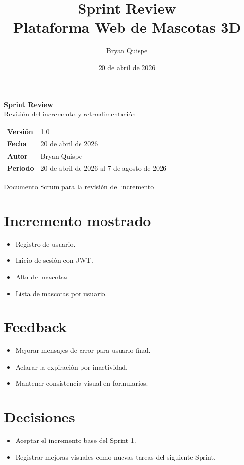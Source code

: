 \documentclass[12pt,a4paper]{article}
\title{\Huge\textbf{Sprint Review}\\[0.3em]\Large Plataforma Web de Mascotas 3D}
\author{Bryan Quispe}
\date{20 de abril de 2026}
\begin{document}
\begin{titlepage}
\centering
\vspace*{1.8cm}
{\Huge\bfseries\color{PrimaryBlue} Sprint Review\\[0.35em]}
{\LARGE Revisión del incremento y retroalimentación\\[1.2cm]}

\begin{tabular}{p{5cm} p{8cm}}
\rowcolor{SoftGray}
\textbf{Versión} & 1.0 \\
\textbf{Fecha} & 20 de abril de 2026 \\
\textbf{Autor} & Bryan Quispe \\
\textbf{Periodo} & 20 de abril de 2026 al 7 de agosto de 2026 \\
\end{tabular}

\vfill
{\large Documento Scrum para la revisión del incremento}
\end{titlepage}

\section{Incremento mostrado}
\begin{itemize}[leftmargin=*]
    \item Registro de usuario.
    \item Inicio de sesión con JWT.
    \item Alta de mascotas.
    \item Lista de mascotas por usuario.
\end{itemize}

\section{Feedback}
\begin{itemize}[leftmargin=*]
    \item Mejorar mensajes de error para usuario final.
    \item Aclarar la expiración por inactividad.
    \item Mantener consistencia visual en formularios.
\end{itemize}

\section{Decisiones}
\begin{itemize}[leftmargin=*]
    \item Aceptar el incremento base del Sprint 1.
    \item Registrar mejoras visuales como nuevas tareas del siguiente Sprint.
\end{itemize}
\end{document}
